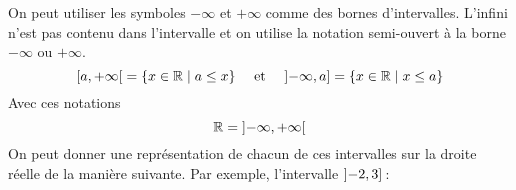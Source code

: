 \documentclass[a4paper,12pt]{report}
\begin{document}
On peut utiliser les symboles $-\infty$ et $+\infty$ comme des bornes d'intervalles. 
L'infini n'est pas contenu dans l'intervalle et on utilise la notation semi-ouvert à la borne $-\infty$ ou $+\infty$. 
\[\interval[open right]{a}{+\infty}=\{x\in \R \mid a\leq x\} \quad \text{ et } \quad \interval[open left]{-\infty}{a}=\{x\in \R\mid x\leq a\}\]
Avec ces notations
\[\R=\interval[open]{-\infty}{+\infty} \]
On peut donner une représentation de chacun de ces intervalles sur la droite réelle de la manière suivante. 
Par exemple, l'intervalle $\interval[open left]{-2}{3}$\,:
\begin{center}
\end{center}
\end{document}
